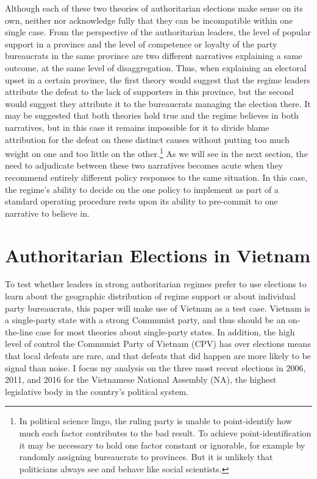 \documentclass[12pt]{article}\usepackage[]{graphicx}\usepackage[]{color}
\newcommand{\1}{\mathbbm{1}}
\begin{document}
Although each of these two theories of authoritarian elections make sense on its own, neither \cite{Magaloni2006} nor \cite{Blaydes2008} acknowledge fully that they can be incompatible within one single case. From the perspective of the authoritarian leaders, the level of popular support in a province and the level of competence or loyalty of the party bureaucrats in the same province are two different narratives explaining a same outcome, at the same level of disaggregation. Thus, when explaining an electoral upset in a certain province, the first theory would suggest that the regime leaders attribute the defeat to the lack of supporters in this province, but the second would suggest they attribute it to the bureaucrats managing the election there. It may be suggested that both theories hold true and the regime believes in both narratives, but in this case it remains impossible for it to divide blame attribution for the defeat on these distinct causes without putting too much weight on one and too little on the other.\footnote{In political science lingo, the ruling party is unable to point-identify how much each factor contributes to the bad result. To achieve point-identification it may be necessary to hold one factor constant or ignorable, for example by randomly assigning bureaucrats to provinces. But it is unlikely that politicians always see and behave like social scientists.} As we will see in the next section, the need to adjudicate between these two narratives becomes acute when they recommend entirely different policy responses to the same situation. In this case, the regime's ability to decide on the one policy to implement as part of a standard operating procedure rests upon its ability to pre-commit to one narrative to believe in.

\section{Authoritarian Elections in Vietnam}
\label{sec:vietnam}
To test whether leaders in strong authoritarian regimes prefer to use elections to learn about the geographic distribution of regime support or about individual party bureaucrats, this paper will make use of Vietnam as a test case. Vietnam is a single-party state with a strong Communist party, and thus should be an on-the-line case for most theories about single-party states. In addition, the high level of control the Communist Party of Vietnam (CPV) has over elections \citep{MaleskySchuler2011} means that local defeats are rare, and that defeats that did happen are more likely to be signal than noise. I focus my analysis on the three most recent elections in 2006, 2011, and 2016 for the Vietnamese National Assembly (NA), the highest legislative body in the country's political system.
\end{document}
